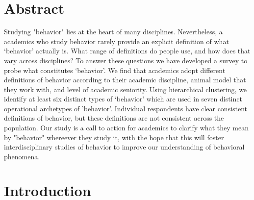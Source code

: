 \documentclass[a4paper, 11pt]{article}
\begin{document}

\vspace{6pt}

\vspace{6pt}



\vspace{18pt}

\section*{Abstract}

Studying "behavior" lies at the heart of many disciplines. Nevertheless, a academics who study behavior rarely provide an explicit definition of what `behavior' actually is. What range of definitions do people use, and how does that vary across disciplines? To answer these questions we have developed a survey to probe what constitutes `behavior'. We find that academics adopt different definitions of behavior according to their academic discipline, animal model that they work with, and level of academic seniority. Using hierarchical clustering, we identify at least six distinct types of `behavior' which are used in seven distinct operational archetypes of 'behavior'. Individual respondents have clear consistent definitions of behavior, but these definitions are not consistent across the population. Our study is a call to action for academics to clarify what they mean by "behavior" whereever they study it, with the hope that this will foster interdisciplinary studies of behavior to improve our understanding of behavioral phenomena.

\vspace{18pt}
\section*{Introduction}
\end{document}
